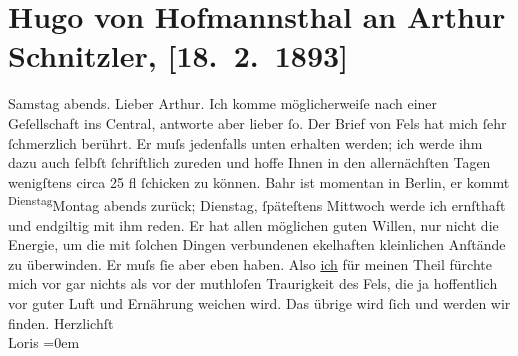 

         
         \renewcommand{\erwaehntePersonen}{Personen: Hermann Bahr, Friedrich Michael Fels}
         \renewcommand{\erwaehnteOrte}{Orte: Berlin, Café Central, Wien}
         \renewcommand{\erwaehnteWerke}{}
               \section[Hugo von Hofmannsthal an Arthur Schnitzler, {[}18. 2. 1893{]}]{ Hugo von Hofmannsthal an Arthur Schnitzler, {[}18. 2. 1893{]}}\nopagebreak{}\rehead{ }\begin{ledgroupsized}[t]{13cm}\normalsize\beginnumbering \toendnotes[C]{\smallbreak\pagebreak[2]} 
\pstart
           \raggedleft{}{\pb}Samstag abends.\pend
           \pstart\center{}Lieber Arthur.\pend\pstart
           Ich komme möglicherweiſe nach einer Geſellschaft ins Central, antworte aber lieber ſo. Der Brief von Fels hat mich ſehr ſchmerzlich berührt. Er muſs
                    jedenfalls unten erhalten werden; ich werde ihm dazu auch ſelbſt ſchriftlich
                    zureden und hoffe Ihnen in den allernächſten Tagen wenigſtens circa 25 fl
                    ſchicken zu können. Bahr ist momentan in Berlin, {\pb}er kommt \substVorne{}\textsuperscript{Dienstag}{\allowbreak}\substDazwischen{}Montag\substHinten{} abends zurück; Dienstag, ſpäteſtens Mittwoch werde ich ernſthaft und
                    endgiltig mit ihm reden. Er hat allen möglichen guten Willen, nur nicht die
                    Energie, um die mit ſolchen Dingen verbundenen ekelhaften kleinlichen Anſtände
                    zu überwinden. Er muſs ſie aber eben haben. Also \uline{ich} für meinen Theil fürchte mich vor gar nichts als vor der muthloſen
                        {\pb}Traurigkeit des Fels, die ja hoffentlich vor guter Luft und
                    Ernährung weichen wird. Das übrige wird ſich und werden wir finden.\pend
           \pstart
           Herzlichſt{\\[\baselineskip]}\spacefill\mbox{Loris}\pend
           \leftskip=0em{}
         

\end{ledgroupsized}
